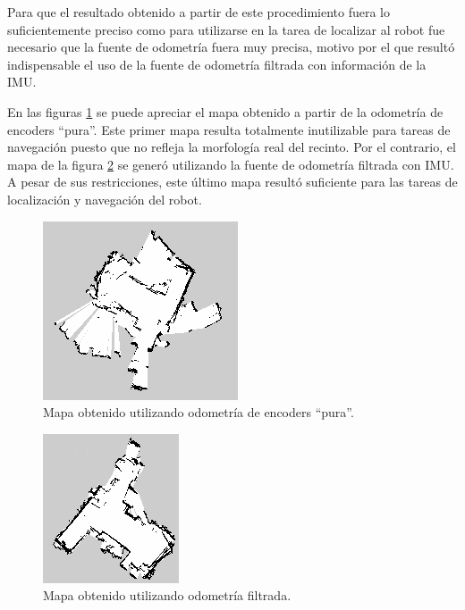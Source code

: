 Para que el resultado obtenido a partir de este procedimiento fuera lo suficientemente preciso como para utilizarse en la tarea de localizar al robot fue necesario que la fuente de odometría fuera muy precisa, motivo por el que resultó indispensable el uso de la fuente de odometría filtrada con información de la IMU.

En las figuras \ref{fig:mapaFeo} se puede apreciar el mapa obtenido a partir de la odometría de encoders ``pura''. Este primer mapa resulta totalmente inutilizable para tareas de navegación puesto que no refleja la morfología real del recinto. Por el contrario, el mapa de la figura \ref{fig:mapaLindo} se generó utilizando la fuente de odometría filtrada con IMU. A pesar de sus restricciones, este último mapa resultó suficiente para las tareas de localización y navegación del robot.


\begin{figure}[ht]
    \centering
    \includegraphics[scale=1.0]{./Figures/mapa_feo.png}
    \caption{Mapa obtenido utilizando odometría de encoders ``pura''.}
    \label{fig:mapaFeo}
\end{figure}

\begin{figure}[ht]
    \centering
    \includegraphics[scale=1.2]{./Figures/mapa_lindo.png}
    \caption{Mapa obtenido utilizando odometría filtrada.}
    \label{fig:mapaLindo}
\end{figure}




